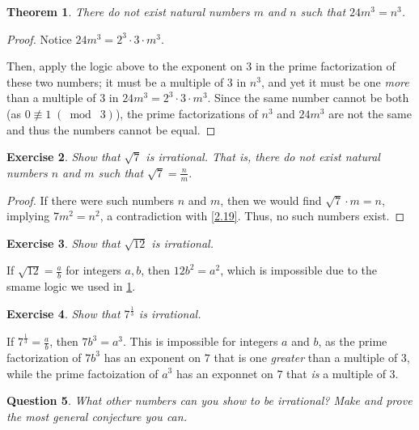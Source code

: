 \documentclass{article}
\newtheorem{thm}{Theorem}[section]
\newtheorem{ques}[thm]{Question}
\newtheorem{ex}[thm]{Exercise}
\numberwithin{equation}{thm}
\providecommand{\gmod}[1]{\; (\bmod \; #1)}
\begin{document}
\begin{thm} \label{2.20}
  There do not exist natural numbers $m$ and $n$ such that $24m^3 = n^3$.
\end{thm}

\begin{proof}
  Notice $24m^3 = 2^3 \cdot 3 \cdot m^3$.

  Then, apply the logic above to the exponent on $3$ in the prime factorization of these two numbers; it must be a multiple of $3$ in $n^3$, and yet it must be one \emph{more} than a multiple of $3$ in $24m^3 = 2^3 \cdot 3 \cdot m^3$. Since the same number cannot be both (as $0 \not \equiv 1 \gmod 3$), the prime factorizations of $n^3$ and $24m^3$ are not the same and thus the numbers cannot be equal.
\end{proof}



\begin{ex} \label{2.21}
  Show that $\sqrt{7}$ is irrational. That is, there do not exist natural numbers $n$ and $m$ such that $\sqrt{7} = \frac{n}{m}$.
\end{ex}

\begin{proof}
  If there were such numbers $n$ and $m$, then we would find $\sqrt{7} \cdot m = n$, implying $7m^2 = n^2$, a contradiction with \ref{2.19}. Thus, no such numbers exist.
\end{proof}



\begin{ex} \label{2.22}
  Show that $\sqrt{12}$ is irrational.
\end{ex}

If $\sqrt{12} = \frac{a}{b}$ for integers $a, b$, then $12b^2 = a^2$, which is impossible due to the smame logic we used in \ref{2.20}.



\begin{ex} \label{2.23}
  Show that $7^{\frac{1}{3}}$ is irrational.
\end{ex}

If $7^{\frac 1 3} = \frac{a}{b}$, then $7b^3 = a^3$. This is impossible for integers $a$ and $b$, as the prime factorization of $7b^3$ has an exponent on $7$ that is one \emph{greater} than a multiple of $3$, while the prime factoization of $a^3$ has an exponnet on $7$ that \emph{is} a multiple of $3$.



\begin{ques} \label{2.24}
  What other numbers can you show to be irrational? Make and prove the most general conjecture you can.
\end{ques}
\end{document}
